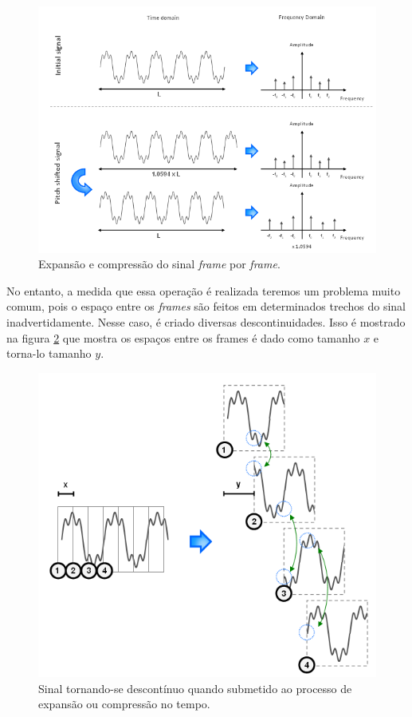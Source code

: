 				\begin{figure}[!ht]
					\centering
					\includegraphics[scale=0.5]{./figuras/pitch-shifter-exem1.PNG}
					\caption{Expansão e compressão do sinal \textit{frame} por \textit{frame}.}
					\label{fig-pitch-shifter-exem02}
				\end{figure}
				
				No entanto, a medida que essa operação é realizada teremos um problema muito comum, pois o espaço entre os \textit{frames} são feitos em determinados trechos do sinal inadvertidamente. Nesse caso, é criado diversas descontinuidades. Isso é mostrado na figura \ref{fig-pitch-shifter-exem03} que mostra os espaços entre os frames é dado como tamanho $ x $ e torna-lo tamanho $ y $.
				
				\begin{figure}[!ht]
					\centering
					\includegraphics[scale=0.5]{./figuras/pitch-descont.PNG}
					\caption{Sinal tornando-se descontínuo quando submetido ao processo de expansão ou compressão no tempo.}
					\label{fig-pitch-shifter-exem03}
				\end{figure} 
				

